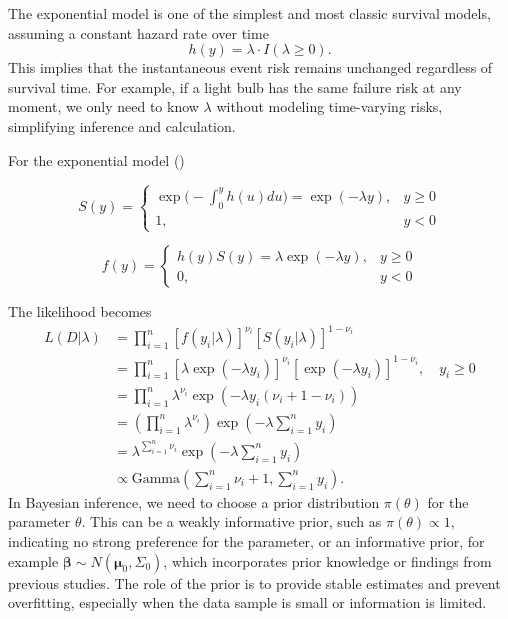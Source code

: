 The exponential model is one of the simplest and most classic survival models, assuming a constant hazard rate over time
$$
h(y) = \lambda \cdot I(\lambda \ge 0).
$$
This implies that the instantaneous event risk remains unchanged regardless of survival time. For example, if a light bulb has the same failure risk at any moment, we only need to know $\lambda$ without modeling time-varying risks, simplifying inference and calculation.

For the exponential model (\cite{ibrahim2013bayesian})


\begin{equation}
    S(y) = 
\begin{cases}
\exp\Big( -\int_0^y h(u) du \Big)=\exp(-\lambda y), & y \ge 0 \\
1, & y < 0 
\end{cases}
\end{equation}

\begin{equation}
    f(y) = 
\begin{cases}
h(y) S(y)=\lambda \exp(-\lambda y), & y \ge 0 \\
0, & y < 0
\end{cases}
\end{equation}

The likelihood becomes
\begin{align*}
L(D | \lambda)
&=\prod_{i=1}^{n}
[f(y_i|\lambda)]^{\nu_i}
[S(y_i|\lambda)]^{1-\nu_i}\\
&=\prod_{i=1}^{n}
[\lambda \exp(-\lambda y_i)]^{\nu_i}
[\exp(-\lambda y_i)]^{1-\nu_i}, \quad   y_i \ge 0 \\
&=
\prod_{i=1}^{n}
\lambda^{\nu_i}
\exp\left(
- \lambda y_i (\nu_i + 1 - \nu_i)
\right) \\
&=
\left(
\prod_{i=1}^{n}
\lambda^{\nu_i}
\right)
\exp\left(
- \lambda \sum_{i=1}^{n} y_i
\right)\\
&=
\lambda^{\sum_{i=1}^{n} \nu_i}
\exp\left(
- \lambda \sum_{i=1}^{n} y_i
\right)\\
&\propto
\text{Gamma}
\left(
\sum_{i=1}^{n} \nu_i + 1,
\sum_{i=1}^{n} y_i
\right).
\end{align*}
In Bayesian inference, we need to choose a prior distribution $\pi(\theta)$ for the parameter $\theta$. This can be a weakly informative prior, such as $\pi(\theta) \propto 1$, indicating no strong preference for the parameter, or an informative prior, for example $\boldsymbol{\beta} \sim N(\boldsymbol{\mu}_0, \Sigma_0)$, which incorporates prior knowledge or findings from previous studies. The role of the prior is to provide stable estimates and prevent overfitting, especially when the data sample is small or information is limited.

